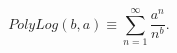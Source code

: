 \begin{equation}\label{poly}
PolyLog(b, a) \equiv \sum_{n=1}^{\infty} \frac{a^n}{n^b}.
\end{equation}

